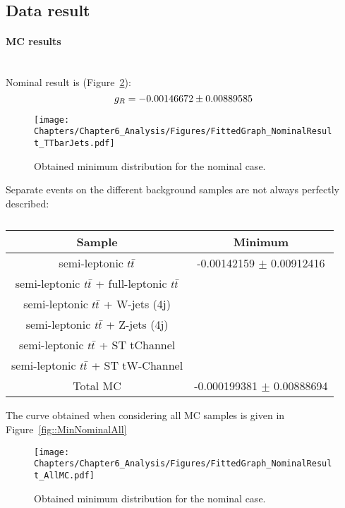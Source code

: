 \subsection{Data result}
\paragraph{MC results } \hfill \\

Nominal result is (Figure~\ref{fig::MinNominal}):
\begin{equation}
 g_{R} = -0.00146672 \pm 0.00889585
\end{equation}

\begin{figure}[h!t]
 \centering
 \texttt{[image: Chapters/Chapter6\_Analysis/Figures/FittedGraph\_NominalResult\_TTbarJets.pdf]}
 \caption{Obtained minimum distribution for the nominal case.} \label{fig::MinNominal}
\end{figure}

Separate events on the different background samples are not always perfectly described:
\begin{table}[h!t]
 \centering
 \caption{} \label{table::BckInfl}
 \renewcommand{\arraystretch}{1.2}
 \begin{tabular}{c|c}
  Sample 						& Minimum 			\\
  \hline
  semi-leptonic $t\bar{t}$ 				& -0.00142159 $\pm$ 0.00912416 	\\
  semi-leptonic $t\bar{t}$ + full-leptonic $t\bar{t}$ 	&  	\\
  semi-leptonic $t\bar{t}$ + W-jets (4j) 			&  	\\
  semi-leptonic $t\bar{t}$ + Z-jets (4j) 			&  		\\
  semi-leptonic $t\bar{t}$ + ST tChannel 			&  	\\
  semi-leptonic $t\bar{t}$ + ST tW-Channel  		&  	\\
  \hline
  Total MC 			& -0.000199381 $\pm$ 0.00888694 
 \end{tabular}
\end{table}

The curve obtained when considering all MC samples is given in Figure~\ref{fig::MinNominalAll}
\begin{figure}[h!t]
 \centering
 \texttt{[image: Chapters/Chapter6\_Analysis/Figures/FittedGraph\_NominalResult\_AllMC.pdf]}
 \caption{Obtained minimum distribution for the nominal case.} \label{fig::MinNominal}
\end{figure}

